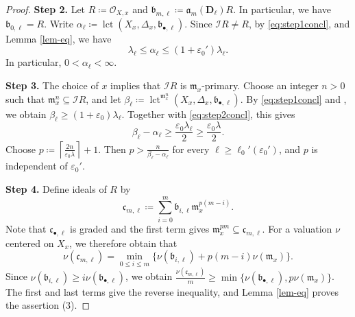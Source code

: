 \documentclass[a4paper,12pt]{amsart}
\theoremstyle{plain}
\theoremstyle{definition}
\numberwithin{equation}{section}
\newcommand{\OO}{\mathcal{O}}
\def\lct{\operatorname{lct}}
\newcommand{\ceil}[1]{\left\lceil #1 \right \rceil}
\begin{document}
\begin{proof}
\smallskip

\noindent \textbf{Step 2.} Let $R\coloneqq \OO_{X,x}$ and $\mathfrak{b}_{m,\ell}\coloneqq \mathfrak{a}_m(\mathbf{D}_{\ell})R$. In particular, we have $\mathfrak{b}_{0,\ell}=R$. Write $\alpha_{\ell}\coloneqq \lct(X_x,\Delta_x,\mathfrak{b}_{\bullet,\ell})$. Since $\mathcal{I}R\neq R$, by \eqref{eq:step1concl}, \cite[Theorem 3.7 and Lemma 3.14]{CJKL} and Lemma \ref{lem-eq}, we have
\begin{equation}\label{eq:step2concl}
\lambda_{\ell}\leq \alpha_{\ell}\leq (1+\varepsilon_0')\lambda_{\ell}.    
\end{equation}
In particular, $0<\alpha_{\ell}<\infty$.

\noindent \textbf{Step 3.} The choice of $x$ implies that $\mathcal{I}R$ is $\mathfrak{m}_x$-primary. Choose an integer $n>0$ such that $\mathfrak{m}_x^n\subseteq \mathcal{I}R$, and let $\beta_{\ell}\coloneqq \lct^{\mathfrak{m}_x^n}(X_x,\Delta_x,\mathfrak{b}_{\bullet,\ell})$. By \eqref{eq:step1concl} and \cite[Theorem 3.7]{CJKL}, we obtain $\beta_{\ell}\geq (1+\varepsilon_0)\lambda_{\ell}$. Together with \eqref{eq:step2concl}, this gives
\begin{equation}
    \beta_{\ell}-\alpha_{\ell}\geq \frac{\varepsilon_0\lambda_{\ell}}{2}\geq \frac{\varepsilon_0\lambda}{2}.
\end{equation}
Choose $p\coloneqq \ceil{\frac{2n}{\varepsilon_0\lambda}}+1$. Then $p>\frac{n}{\beta_{\ell}-\alpha_{\ell}}$ for every $\ell\geq\ell_0'(\varepsilon_0')$, and $p$ is independent of $\varepsilon_0'$.

\smallskip

\noindent \textbf{Step 4.} Define ideals of $R$ by
\[
\mathfrak{c}_{m,\ell}\coloneqq \sum_{i=0}^m \mathfrak{b}_{i,\ell}\mathfrak{m}_x^{p(m-i)}.
\]
Note that $\mathfrak{c}_{\bullet,\ell}$ is graded and the first term gives $\mathfrak{m}_x^{pm}\subseteq \mathfrak{c}_{m,\ell}$. For a valuation $\nu$ centered on $X_x$, we therefore obtain that
\[
\nu(\mathfrak{c}_{m,\ell})=\min_{0\leq i\leq m}\{\nu(\mathfrak{b}_{i,\ell})+p(m-i)\nu(\mathfrak{m}_x)\}.
\]
Since $\nu(\mathfrak{b}_{i,\ell})\geq i\nu(\mathfrak{b}_{\bullet,\ell})$, we obtain $\frac{\nu(\mathfrak{c}_{m,\ell})}{m}\geq \min\{\nu(\mathfrak{b}_{\bullet,\ell}),p\nu(\mathfrak{m}_x)\}$. The first and last terms give the reverse inequality, and Lemma \ref{lem-eq} proves the assertion (3).


\end{proof}
\end{document}

